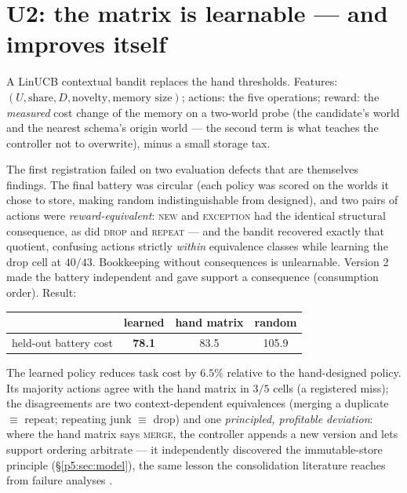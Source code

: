 \documentclass{article}
\begin{document}
\section{U2: the matrix is learnable --- and improves itself}
\label{p5:sec:u2}

A LinUCB contextual bandit replaces the hand thresholds. Features:
$(U, \text{share}, D, \text{novelty}, \text{memory size})$; actions:
the five operations; reward: the \emph{measured} cost change of the
memory on a two-world probe (the candidate's world and the nearest
schema's origin world --- the second term is what teaches the
controller not to overwrite), minus a small storage tax.

The first registration failed on two evaluation defects that are
themselves findings. The final battery was circular (each policy was
scored on the worlds it chose to store, making random indistinguishable
from designed), and two pairs of actions were
\emph{reward-equivalent}: \textsc{new} and \textsc{exception} had the
identical structural consequence, as did \textsc{drop} and
\textsc{repeat} --- and the bandit recovered exactly that quotient,
confusing actions strictly \emph{within} equivalence classes while
learning the drop cell at $40/43$. Bookkeeping without consequences
is unlearnable. Version 2 made the battery independent and gave
support a consequence (consumption order). Result:

\begin{center}
\small
\begin{tabular}{lccc}
\toprule
 & learned & hand matrix & random \\
\midrule
held-out battery cost & \textbf{78.1} & 83.5 & 105.9 \\
\bottomrule
\end{tabular}
\end{center}

The learned policy reduces task cost by $6.5\%$ relative to the hand-designed policy. Its majority
actions agree with the hand matrix in $3/5$ cells (a registered
miss); the disagreements are two context-dependent equivalences
(merging a duplicate $\equiv$ repeat; repeating junk $\equiv$ drop)
and one \emph{principled, profitable deviation}: where the hand
matrix says \textsc{merge}, the controller appends a new version and
lets support ordering arbitrate --- it independently discovered the
immutable-store principle (\S\ref{p5:sec:model}), the same lesson the
consolidation literature reaches from failure analyses
\citep{trustmem2026,faulty2026}.
\end{document}
